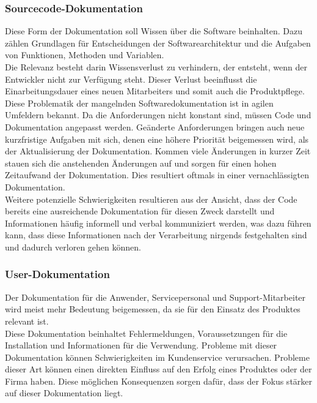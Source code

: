 \subsubsection{Sourcecode-Dokumentation}
Diese Form der Dokumentation soll Wissen über die Software beinhalten. Dazu zählen Grundlagen für Entscheidungen der Softwarearchitektur und die Aufgaben von Funktionen, Methoden und Variablen.\\
Die Relevanz besteht darin Wissensverlust zu verhindern, der entsteht, wenn der Entwickler nicht zur Verfügung steht. Dieser Verlust beeinflusst die Einarbeitungsdauer eines neuen Mitarbeiters und somit auch die Produktpflege. \\
Diese Problematik der mangelnden Softwaredokumentation ist in agilen Umfeldern bekannt. Da die Anforderungen nicht konstant sind, müssen Code und Dokumentation angepasst werden. Geänderte Anforderungen bringen auch neue kurzfristige Aufgaben mit sich, denen eine höhere Priorität beigemessen wird, als der Aktualisierung der Dokumentation. Kommen viele Änderungen in kurzer Zeit stauen sich die anstehenden Änderungen auf und sorgen für einen hohen Zeitaufwand der Dokumentation. Dies resultiert oftmals in einer vernachlässigten Dokumentation.\\
Weitere potenzielle Schwierigkeiten resultieren aus der Ansicht, dass der Code bereits eine ausreichende Dokumentation für diesen Zweck darstellt und Informationen häufig informell und verbal kommuniziert werden, was dazu führen kann, dass diese Informationen nach der Verarbeitung nirgends festgehalten sind und dadurch verloren gehen können\cite{THEUNISSEN2022106733}.\newline
\noindent
\subsubsection{User-Dokumentation}
Der Dokumentation für die Anwender, Servicepersonal und Support-Mitarbeiter wird meist mehr Bedeutung beigemessen, da sie für den Einsatz des Produktes relevant ist.\\
Diese Dokumentation beinhaltet Fehlermeldungen, Voraussetzungen für die Installation und Informationen für die Verwendung. Probleme mit dieser Dokumentation können Schwierigkeiten im Kundenservice verursachen. Probleme dieser Art können einen direkten Einfluss auf den Erfolg eines Produktes oder der Firma haben. Diese möglichen Konsequenzen sorgen dafür, dass der Fokus stärker auf dieser Dokumentation liegt\cite{THEUNISSEN2022106733}.

